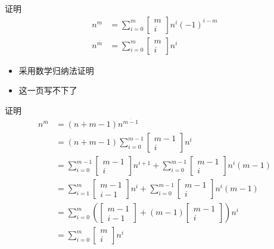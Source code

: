 \documentclass{beamer}
\begin{document}
\begin{frame}{证明}
    $$\begin{aligned}
        n^{\underline{m}} &= \sum_{i = 0}^m \begin{bmatrix}m\\ i\end{bmatrix}n^i(-1)^{i - m}\\
        n^{\overline{m}} &= \sum_{i = 0}^m \begin{bmatrix}m\\ i\end{bmatrix}n^i
    \end{aligned}$$ \pause
    \begin{itemize}
        \item 采用数学归纳法证明
        \item 这一页写不下了
    \end{itemize}
\end{frame}

\begin{frame}{证明}
    $$\begin{aligned}
        n^{\overline{m}} &= (n + m - 1)n^{\overline{m - 1}}\\
        &= (n + m - 1)\sum_{i = 0}^{m - 1}\begin{bmatrix}m - 1\\ i\end{bmatrix}n^i\\
        &= \sum_{i = 0}^{m - 1}\begin{bmatrix}m - 1\\ i\end{bmatrix}n^{i + 1} + \sum_{i = 0}^{m - 1}\begin{bmatrix}m - 1\\ i\end{bmatrix}n^i(m - 1)\\
        &= \sum_{i = 1}^{m}\begin{bmatrix}m - 1\\ i - 1\end{bmatrix}n^{i} + \sum_{i = 0}^{m - 1}\begin{bmatrix}m - 1\\ i\end{bmatrix}n^i(m - 1)\\
        &= \sum_{i = 0}^m\left(\begin{bmatrix}m - 1\\ i - 1\end{bmatrix} + (m - 1)\begin{bmatrix}m - 1\\ i\end{bmatrix}\right)n^i\\
        &= \sum_{i = 0}^m \begin{bmatrix}m\\ i\end{bmatrix}n^i
    \end{aligned}$$
\end{frame}
\end{document}
